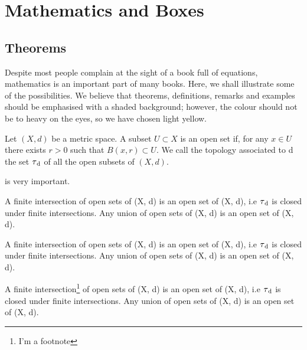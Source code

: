 \setchapterpreamble[u]{\margintoc}
\chapter{Mathematics and Boxes}

\section{Theorems}

Despite most people complain at the sight of a book full of equations, 
mathematics is an important part of many books. Here, we shall 
illustrate some of the possibilities. We believe that theorems, 
definitions, remarks and examples should be emphasised with a shaded 
background; however, the colour should not be to heavy on the eyes, so 
we have chosen light yellow.

\begin{definition}
Let $(X, d)$ be a metric space. A subset $U \subset X$ is an open set 
if, for any $x \in U$ there exists $r > 0$ such that $B(x, r) \subset 
U$. We call the topology associated to d the set $\tau\textsubscript{d}$ 
of all the open subsets of $(X, d).$
\end{definition}

 is very important.

\begin{theorem}
A finite intersection of open sets of (X, d) is an open set of (X, d), 
i.e $\tau\textsubscript{d}$ is closed under finite intersections. Any 
union of open sets of (X, d) is an open set of (X, d).
\end{theorem}

\begin{proposition}
A finite intersection of open sets of (X, d) is an open set of (X, d), 
i.e $\tau\textsubscript{d}$ is closed under finite intersections. Any 
union of open sets of (X, d) is an open set of (X, d).
\end{proposition}


\begin{lemma}
A finite intersection\footnote{I'm a footnote} of open sets of (X, d) is 
an open set of (X, d), i.e $\tau\textsubscript{d}$ is closed under 
finite intersections. Any union of open sets of (X, d) is an open set of 
(X, d).
\end{lemma}

